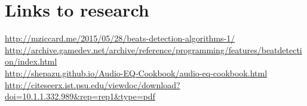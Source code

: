 \documentclass[a4paper]{article}
\begin{document}
    \section{Links to research}
        \url{http://mziccard.me/2015/05/28/beats-detection-algorithms-1/}\\
        \url{http://archive.gamedev.net/archive/reference/programming/features/beatdetection/index.html}\\
        \url{http://shepazu.github.io/Audio-EQ-Cookbook/audio-eq-cookbook.html}\\
        \url{http://citeseerx.ist.psu.edu/viewdoc/download?doi=10.1.1.332.989&rep=rep1&type=pdf}\\
        \url{}\\
        \url{}\\
\end{document}
